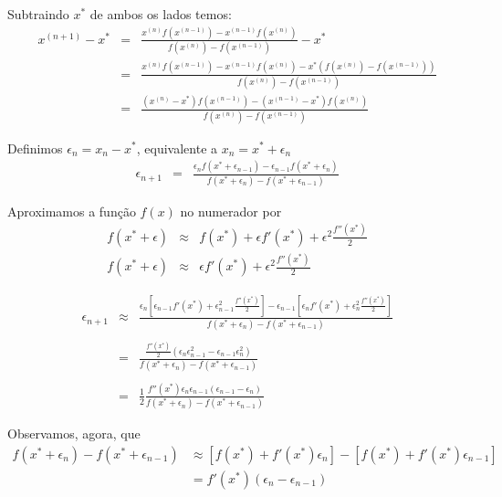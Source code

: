 Subtraindo $x^*$ de ambos os lados temos:
\begin{eqnarray*}
x^{(n+1)}-x^*
 &=&\frac{x^{(n)} f(x^{(n-1)})-x^{(n-1)}f(x^{(n)})}{f(x^{(n)})-f(x^{(n-1)})}-x^*\\
 &=&\frac{x^{(n)} f(x^{(n-1)})-x^{(n-1)}f(x^{(n)})-x^*\left(f(x^{(n)})-f(x^{(n-1)})\right)}{f(x^{(n)})-f(x^{(n-1)})}\\
 &=&\frac{(x^{(n)}-x^*) f(x^{(n-1)})-(x^{(n-1)}-x^*)f(x^{(n)})}{f(x^{(n)})-f(x^{(n-1)})}
\end{eqnarray*}

Definimos $\epsilon_n=x_n-x^*$, equivalente a $x_n=x^*+\epsilon_n$
\begin{eqnarray*}
\epsilon_{n+1}
 &=&\frac{\epsilon_n f(x^*+\epsilon_{n-1})-\epsilon_{n-1}f(x^*+\epsilon_n)}{f(x^*+\epsilon_n)-f(x^*+\epsilon_{n-1})}
\end{eqnarray*}

Aproximamos a função $f(x)$ no numerador por
\begin{eqnarray*}
f(x^*+\epsilon)&\approx& f(x^*)+\epsilon f'(x^*) + \epsilon^2 \frac{f''(x^*)}{2}\\
f(x^*+\epsilon)&\approx& \epsilon f'(x^*) + \epsilon^2 \frac{f''(x^*)}{2}
\end{eqnarray*}

\begin{eqnarray*}
\epsilon_{n+1}
 &\approx&\frac{\epsilon_n \left[\epsilon_{n-1} f'(x^*) + \epsilon_{n-1}^2 \frac{f''(x^*)}{2}\right]-\epsilon_{n-1}\left[\epsilon_{n} f'(x^*) + \epsilon_{n}^2 \frac{f''(x^*)}{2}\right]}{f(x^*+\epsilon_n)-f(x^*+\epsilon_{n-1})}\\
~\\ &=&\frac{\frac{f''(x^*)}{2}\left(\epsilon_{n}\epsilon_{n-1}^2-\epsilon_{n-1}\epsilon_{n}^2\right)}{f(x^*+\epsilon_n)-f(x^*+\epsilon_{n-1})}\\
~\\ &=&\frac{1}{2}\frac{{f''(x^*)}\epsilon_{n}\epsilon_{n-1}\left(\epsilon_{n-1}-\epsilon_{n}\right)}{f(x^*+\epsilon_n)-f(x^*+\epsilon_{n-1})}
\end{eqnarray*}

Observamos, agora, que
\begin{equation}
  \begin{split}
  f(x^*+\epsilon_n)-f(x^*+\epsilon_{n-1}) &\approx \left[f(x^*)+f'(x^*)\epsilon_n\right]-\left[f(x^*)+f'(x^*)\epsilon_{n-1}\right] \\
  &=f'(x^*)(\epsilon_n-\epsilon_{n-1})  
  \end{split}  
\end{equation}

